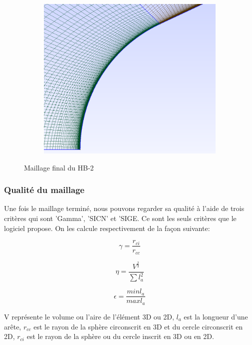 \begin{figure}[H]
\begin{center}
\begin{subfigure}{0.5\textwidth}
\includegraphics[width=\textwidth]{chapter1_introduction/pictures/gmsh/hb2_mesh3.png}
\end{subfigure}
\caption{Maillage final du HB-2}
\end{center}
\end{figure}
\newpage
\subsubsection{Qualité du maillage}

Une fois le maillage terminé, nous pouvons regarder sa qualité à l'aide de trois critères qui sont 'Gamma',  'SICN' et 'SIGE. Ce sont les seuls critères que le logiciel propose. On les calcule respectivement de la façon suivante:


\begin{equation}
    \gamma = \frac{r_{ci}}{r_{cc}}
\end{equation}

\begin{equation}
    \eta = \frac{V^{\frac{2}{3}}}{\sum l_a^2}
\end{equation}

\begin{equation}
    \epsilon = \frac{minl_a}{maxl_a}
\end{equation}

V représente le volume ou l'aire de l'élément 3D ou 2D, $l_a$ est la longueur d'une arête, $r_{cc}$ est le rayon de la sphère circonscrit en 3D et du cercle circonscrit en 2D, $r_{ci}$ est le rayon de la sphère ou du cercle inscrit en 3D ou en 2D.

